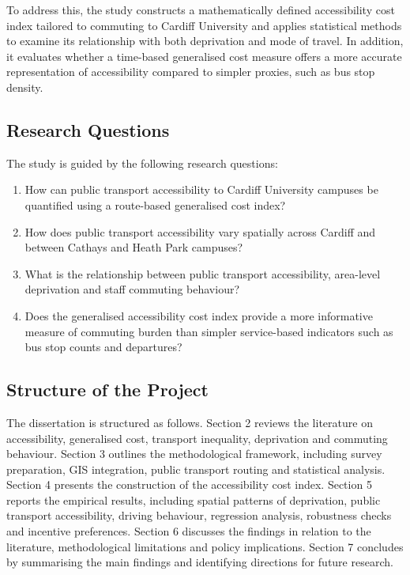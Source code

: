 \documentclass[11pt,a4paper]{article}
\begin{document}
To address this, the study constructs a mathematically defined accessibility cost index tailored to commuting to Cardiff University and applies statistical methods to examine its relationship with both deprivation and mode of travel. In addition, it evaluates whether a time-based generalised cost measure offers a more accurate representation of accessibility compared to simpler proxies, such as bus stop density.


\subsection{Research Questions}

The study is guided by the following research questions:

\begin{enumerate}
    \item How can public transport accessibility to Cardiff University campuses be quantified using a route-based generalised cost index?
    \item How does public transport accessibility vary spatially across Cardiff and between Cathays and Heath Park campuses?
    \item What is the relationship between public transport accessibility, area-level deprivation and staff commuting behaviour?
    \item Does the generalised accessibility cost index provide a more informative measure of commuting burden than simpler service-based indicators such as bus stop counts and departures?
\end{enumerate}

\subsection{Structure of the Project}

The dissertation is structured as follows. Section 2 reviews the literature on accessibility, generalised cost, transport inequality, deprivation and commuting behaviour. Section 3 outlines the methodological framework, including survey preparation, GIS integration, public transport routing and statistical analysis. Section 4 presents the construction of the accessibility cost index. Section 5 reports the empirical results, including spatial patterns of deprivation, public transport accessibility, driving behaviour, regression analysis, robustness checks and incentive preferences. Section 6 discusses the findings in relation to the literature, methodological limitations and policy implications. Section 7 concludes by summarising the main findings and identifying directions for future research.
\newpage
\end{document}
